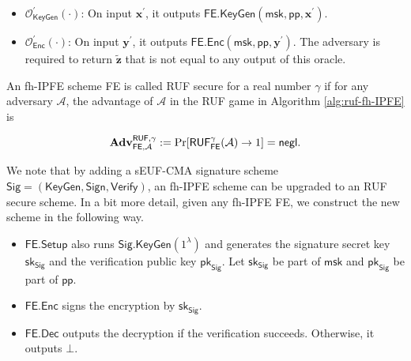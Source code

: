 \begin{itemize}

	\item $\mathcal{O}^\prime_{\textsf{KeyGen}}(\cdot)$: On input $\mathbf{x}^\prime$, it outputs $\textsf{FE.KeyGen}(\textsf{msk}, \textsf{pp}, \mathbf{x}^\prime)$.
	
	\item $\mathcal{O}^\prime_{\textsf{Enc}}(\cdot)$: On input $\mathbf{y}^\prime$, it outputs $\textsf{FE.Enc}(\textsf{msk}, \textsf{pp}, \mathbf{y}^\prime)$. The adversary is required to return $\mathbf{\tilde{z}}$ that is not equal to any output of this oracle.
\end{itemize}


\begin{definition}

	An fh-IPFE scheme \textsf{FE} is called RUF secure for a real number $\gamma$ if for any adversary $\mathcal{A}$, the advantage of $\mathcal{A}$ in the \textsf{RUF} game in Algorithm \ref{alg:ruf-fh-IPFE} is

\[
	\mathbf{Adv}_{\textsf{FE}, \mathcal{A}}^{\textsf{RUF}, \gamma} := \Pr[\textsf{RUF}^\gamma_{\textsf{FE}}(\mathcal{A}) \to 1 ] = \mathsf{negl}.
\]

\end{definition}

We note that by adding a sEUF-CMA signature scheme $\textsf{Sig} = ( \textsf{KeyGen}, \textsf{Sign}, \textsf{Verify} )$, an fh-IPFE scheme can be upgraded to an RUF secure scheme. In a bit more detail, given any fh-IPFE \textsf{FE}, we construct the new scheme in the following way.

\begin{itemize}

	\item $\textsf{FE.Setup}$ also runs $\textsf{Sig.KeyGen}(1^\lambda)$ and generates the signature secret key $\textsf{sk}_{\textsf{Sig}}$ and the verification public key $ \textsf{pk}_{\textsf{Sig}}$. Let $\textsf{sk}_{\textsf{Sig}}$ be part of $\textsf{msk}$ and $\textsf{pk}_{\textsf{Sig}}$ be part of $\textsf{pp}$.

	\item $\textsf{FE.Enc}$ signs the encryption by $\textsf{sk}_{\textsf{Sig}}$.

	\item $\textsf{FE.Dec}$ outputs the decryption if the verification succeeds. Otherwise, it outputs $\bot$.

\end{itemize}

